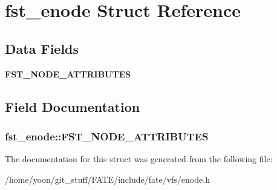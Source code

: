 \hypertarget{structfst__enode}{\section{fst\-\_\-enode Struct Reference}
\label{structfst__enode}
}
\subsection*{Data Fields}
\begin{DoxyCompactItemize}
\item 
\hypertarget{structfst__enode_a77dbce187a88ad4bce6762d308bedc4c}{{\bfseries F\-S\-T\-\_\-\-N\-O\-D\-E\-\_\-\-A\-T\-T\-R\-I\-B\-U\-T\-E\-S}}\label{structfst__enode_a77dbce187a88ad4bce6762d308bedc4c}

\end{DoxyCompactItemize}


\subsection{Field Documentation}
\hypertarget{structfst__enode_a77dbce187a88ad4bce6762d308bedc4c}{
\subsubsection[{F\-S\-T\-\_\-\-N\-O\-D\-E\-\_\-\-A\-T\-T\-R\-I\-B\-U\-T\-E\-S}]{\setlength{\rightskip}{0pt plus 5cm}fst\-\_\-enode\-::\-F\-S\-T\-\_\-\-N\-O\-D\-E\-\_\-\-A\-T\-T\-R\-I\-B\-U\-T\-E\-S}}\label{structfst__enode_a77dbce187a88ad4bce6762d308bedc4c}


The documentation for this struct was generated from the following file\-:\begin{DoxyCompactItemize}
\item 
/home/yoon/git\-\_\-stuff/\-F\-A\-T\-E/include/fate/vfs/enode.\-h\end{DoxyCompactItemize}
